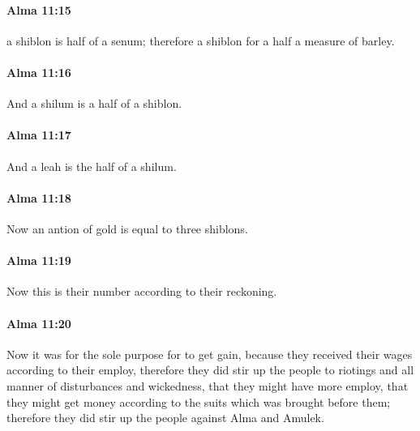 		\paragraph{Alma 11:15} %
			\label{ALMA-11-15}

			a shiblon is half of a senum;
			therefore a shiblon for a half a measure of barley.

		\paragraph{Alma 11:16} %
			\label{ALMA-11-16}

			And a shilum is a half of a shiblon.

		\paragraph{Alma 11:17} %
			\label{ALMA-11-17}

			And a leah is the half of a shilum.\phantom{.}

		\paragraph{Alma 11:18} %
			\label{ALMA-11-18}

			Now an antion of gold is equal to three shiblons.

		\paragraph{Alma 11:19} %
			\label{ALMA-11-19}

			Now this is their number according to their reckoning.

		\paragraph{Alma 11:20} %
			\label{ALMA-11-20}

			Now it was for the sole purpose for to get gain,
			because they received their wages according to their employ,
			therefore they did stir up the people to riotings
			and all manner of disturbances and wickedness,
			that they might have more employ,
			that they might get money according to the suits
			which was brought before them;
			therefore they did stir up the people against Alma and Amulek.

